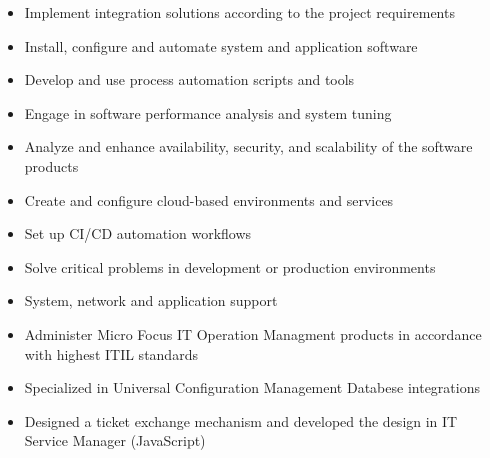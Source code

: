 \documentclass[10pt,a4paper,ragged2e,withhyper]{altacv}
\begin{document}
\begin{itemize}
\item Implement integration solutions according to the project requirements
\item Install, configure and automate system and application software
\item Develop and use process automation scripts and tools
\item Engage in software performance analysis and system tuning
\item Analyze and enhance availability, security, and scalability of the software products
\item Create and configure cloud-based environments and services
\item Set up CI/CD automation workflows
\item Solve critical problems in development or production environments
\item System, network and application support
\end{itemize}
\divider

\begin{itemize}
\item Administer Micro Focus IT Operation Managment products in accordance with highest ITIL standards
\item Specialized in Universal Configuration Management Databese integrations
\item Designed a ticket exchange mechanism and developed the design in IT Service Manager (JavaScript)
\end{itemize}



\newpage
\end{document}
